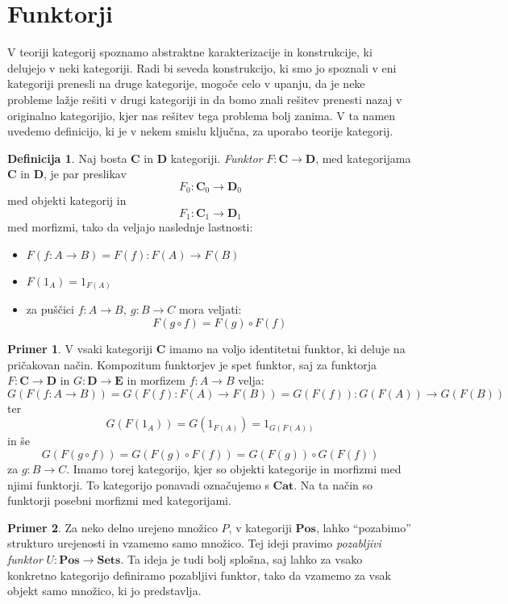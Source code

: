 \documentclass[12pt,a4paper]{book}
\theoremstyle{definition}
\newtheorem{definicija}{Definicija}[chapter]
\theoremstyle{plain}
\theoremstyle{definition}
\newtheorem{primer}{Primer}[section]
\theoremstyle{remark}
\newcommand{\cat}[1]{\textbf{#1}}
\begin{document}
\section{Funktorji}

V teoriji kategorij spoznamo abstraktne karakterizacije in konstrukcije, ki delujejo v neki kategoriji. Radi bi seveda konstrukcijo, ki smo jo spoznali v eni kategoriji prenesli na druge kategorije, mogoče celo v upanju, da je neke probleme lažje rešiti v drugi kategoriji in da bomo znali rešitev prenesti nazaj v originalno kategorijio, kjer nas rešitev tega problema bolj zanima. V ta namen uvedemo definicijo, ki je v nekem smislu ključna, za uporabo teorije kategorij.

\begin{definicija}
Naj bosta $\cat{C}$ in $\cat{D}$ kategoriji. \emph{Funktor} $F : \cat{C} \to \cat{D}$, med kategorijama $\cat{C}$ in $\cat{D}$, je par preslikav
$$F_0 : \cat{C}_0 \to \cat{D}_0$$
med objekti kategorij in
$$F_1 : \cat{C}_1 \to \cat{D}_1$$
med morfizmi, tako da veljajo naslednje lastnosti:
\begin{itemize}
\item $F(f : A \to B) = F(f) : F(A) \to F(B)$
\item $F(1_A) = 1_{F(A)}$
\item za puščici $f : A \to B, \ g : B \to C$ mora veljati:
$$F(g \circ f) = F(g) \circ F(f)$$
\end{itemize}
\end{definicija}

\begin{primer}
V vsaki kategoriji $\cat{C}$ imamo na voljo identitetni funktor, ki deluje na pričakovan način. Kompozitum funktorjev je spet funktor, saj za funktorja $F : \cat{C} \to \cat{D}$ in $G : \cat{D} \to \cat{E}$ in morfizem $f : A \to B$ velja:
$$G(F(f : A \to B)) = G(F(f) : F(A) \to F(B)) = G(F(f)) : G(F(A)) \to G(F(B))$$
ter
$$G(F(1_A)) = G(1_{F(A)}) = 1_{G(F(A))}$$
in še
$$G(F(g \circ f)) = G(F(g) \circ F(f)) = G(F(g)) \circ G(F(f))$$
za $g : B \to C$. Imamo torej kategorijo, kjer so objekti kategorije in morfizmi med njimi funktorji. To kategorijo ponavadi označujemo s $\cat{Cat}$. Na ta način so funktorji posebni morfizmi med kategorijami.
\end{primer}

\begin{primer}
Za neko delno urejeno množico $P$, v kategoriji $\cat{Pos}$, lahko "`pozabimo"' strukturo urejenosti in vzamemo samo množico. Tej ideji pravimo \emph{pozabljivi funktor} $U : \cat{Pos} \to \cat{Sets}$. Ta ideja je tudi bolj splošna, saj lahko za vsako konkretno kategorijo definiramo pozabljivi funktor, tako da vzamemo za vsak objekt samo množico, ki jo predstavlja.
\end{primer}
\end{document}
